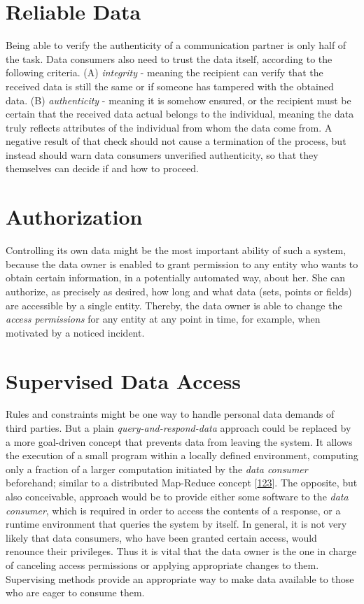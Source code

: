 \documentclass[12pt,english,a4paper,titlepage,cleardoublepage=empty,dottedtoc]{report}
\begin{document}
\section{Reliable Data}\label{reliable-data}

Being able to verify the authenticity of a communication partner is only
half of the task. Data consumers also need to trust the data itself,
according to the following criteria. (A) \emph{integrity} - meaning the
recipient can verify that the received data is still the same or if
someone has tampered with the obtained data. (B) \emph{authenticity} -
meaning it is somehow ensured, or the recipient must be certain that the
received data actual belongs to the individual, meaning the data truly
reflects attributes of the individual from whom the data come from. A
negative result of that check should not cause a termination of the
process, but instead should warn data consumers unverified authenticity,
so that they themselves can decide if and how to proceed.

\section{Authorization}\label{authorization}

Controlling its own data might be the most important ability of such a
system, because the data owner is enabled to grant permission to any
entity who wants to obtain certain information, in a potentially
automated way, about her. She can authorize, as precisely as desired,
how long and what data (sets, points or fields) are accessible by a
single entity. Thereby, the data owner is able to change the
\emph{access permissions} for any entity at any point in time, for
example, when motivated by a noticed incident.

\hypertarget{supervised-data-access}{\section{Supervised Data
Access}\label{supervised-data-access}}

Rules and constraints might be one way to handle personal data demands
of third parties. But a plain \emph{query-and-respond-data} approach
could be replaced by a more goal-driven concept that prevents data from
leaving the system. It allows the execution of a small program within a
locally defined environment, computing only a fraction of a larger
computation initiated by the \emph{data consumer} beforehand; similar to
a distributed Map-Reduce concept
{[}\protect\hyperlink{ref-paper_2004_distributed-mapreduce}{123}{]}. The
opposite, but also conceivable, approach would be to provide either some
software to the \emph{data consumer}, which is required in order to
access the contents of a response, or a runtime environment that queries
the system by itself. In general, it is not very likely that data
consumers, who have been granted certain access, would renounce their
privileges. Thus it is vital that the data owner is the one in charge of
canceling access permissions or applying appropriate changes to them.
Supervising methods provide an appropriate way to make data available to
those who are eager to consume them.
\end{document}
